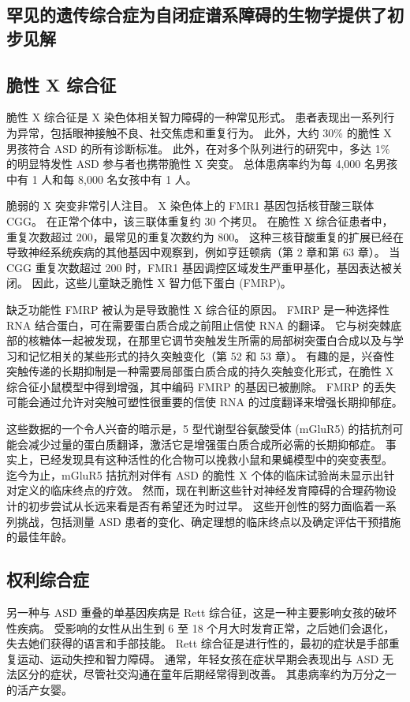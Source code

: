 \subsection{罕见的遗传综合症为自闭症谱系障碍的生物学提供了初步见解}
\subsection{脆性 X 综合征}
脆性 X 综合征是 X 染色体相关智力障碍的一种常见形式。 患者表现出一系列行为异常，包括眼神接触不良、社交焦虑和重复行为。 此外，大约 30\% 的脆性 X 男孩符合 ASD 的所有诊断标准。 此外，在对多个队列进行的研究中，多达 1\% 的明显特发性 ASD 参与者也携带脆性 X 突变。 总体患病率约为每 4,000 名男孩中有 1 人和每 8,000 名女孩中有 1 人。

脆弱的 X 突变非常引人注目。 X 染色体上的 FMR1 基因包括核苷酸三联体 CGG。 在正常个体中，该三联体重复约 30 个拷贝。 在脆性 X 综合征患者中，重复次数超过 200，最常见的重复次数约为 800。 这种三核苷酸重复的扩展已经在导致神经系统疾病的其他基因中观察到，例如亨廷顿病（第 2 章和第 63 章）。 当 CGG 重复次数超过 200 时，FMR1 基因调控区域发生严重甲基化，基因表达被关闭。 因此，这些儿童缺乏脆性 X 智力低下蛋白 (FMRP)。

缺乏功能性 FMRP 被认为是导致脆性 X 综合征的原因。 FMRP 是一种选择性 RNA 结合蛋白，可在需要蛋白质合成之前阻止信使 RNA 的翻译。 它与树突棘底部的核糖体一起被发现，在那里它调节突触发生所需的局部树突蛋白合成以及与学习和记忆相关的某些形式的持久突触变化（第 52 和 53 章）。 有趣的是，兴奋性突触传递的长期抑制是一种需要局部蛋白质合成的持久突触变化形式，在脆性 X 综合征小鼠模型中得到增强，其中编码 FMRP 的基因已被删除。 FMRP 的丢失可能会通过允许对突触可塑性很重要的信使 RNA 的过度翻译来增强长期抑郁症。

这些数据的一个令人兴奋的暗示是，5 型代谢型谷氨酸受体 (mGluR5) 的拮抗剂可能会减少过量的蛋白质翻译，激活它是增强蛋白质合成所必需的长期抑郁症。 事实上，已经发现具有这种活性的化合物可以挽救小鼠和果蝇模型中的突变表型。 迄今为止，mGluR5 拮抗剂对伴有 ASD 的脆性 X 个体的临床试验尚未显示出针对定义的临床终点的疗效。 然而，现在判断这些针对神经发育障碍的合理药物设计的初步尝试从长远来看是否有希望还为时过早。 这些开创性的努力面临着一系列挑战，包括测量 ASD 患者的变化、确定理想的临床终点以及确定评估干预措施的最佳年龄。

\subsection{权利综合症}
另一种与 ASD 重叠的单基因疾病是 Rett 综合征，这是一种主要影响女孩的破坏性疾病。 受影响的女性从出生到 6 至 18 个月大时发育正常，之后她们会退化，失去她们获得的语言和手部技能。 Rett 综合征是进行性的，最初的症状是手部重复运动、运动失控和智力障碍。 通常，年轻女孩在症状早期会表现出与 ASD 无法区分的症状，尽管社交沟通在童年后期经常得到改善。 其患病率约为万分之一的活产女婴。

